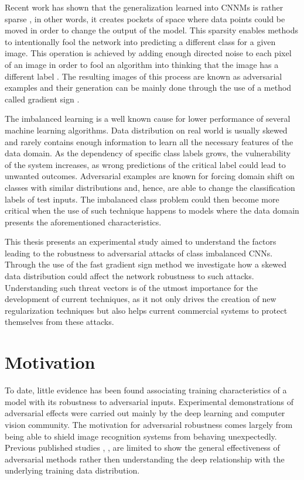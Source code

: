Recent work has shown that the generalization learned into CNNMs is rather sparse \cite{goodfellow2016}, in other words, it creates pockets of space where data points could be moved in order to change the output of the model. This sparsity enables methods to intentionally fool the network into predicting a different class for a given image. This operation is achieved by adding enough directed noise to each pixel of an image in order to fool an algorithm into thinking that the image has a different label \cite{goodfellow2014}\cite{papernot2016transf}\cite{goodfellow2016}\cite{szegedy2013}. The resulting images of this process are known as adversarial examples and their generation can be mainly done through the use of a method called gradient sign \cite{goodfellow2014}.

The imbalanced learning is a well known cause for lower performance of several machine learning algorithms. Data distribution on real world is usually skewed and rarely contains enough information to learn all the necessary features of the data domain. As the dependency of specific class labels grows, the vulnerability of the system increases, as wrong predictions of the critical label could lead to unwanted outcomes. Adversarial examples are known for forcing domain shift on classes with similar distributions and, hence, are able to change the classification labels of test inputs. The imbalanced class problem could then become more critical when the use of such technique happens to models where the data domain presents the aforementioned characteristics.

This thesis presents an experimental study aimed to understand the factors leading to the robustness to adversarial attacks of  class imbalanced CNNs. Through the use of the fast gradient sign method we investigate how a skewed data distribution could affect the network robustness to such attacks. Understanding such threat vectors is of the utmost importance for the development of current techniques, as it not only drives the creation of new regularization techniques but also helps current commercial systems to protect themselves from these attacks.


\section{Motivation}

To date, little evidence has been found associating training characteristics of a model with its robustness to adversarial inputs. Experimental demonstrations of adversarial effects were carried out mainly by the deep learning and computer vision community. The motivation for adversarial robustness comes largely from being able to shield image recognition systems from behaving unexpectedly. Previous published studies \cite{papernot2016}, \cite{goodfellow2014}, \cite{billovits} are limited to show the general effectiveness of adversarial methods rather then understanding the deep relationship with the underlying training data distribution.

